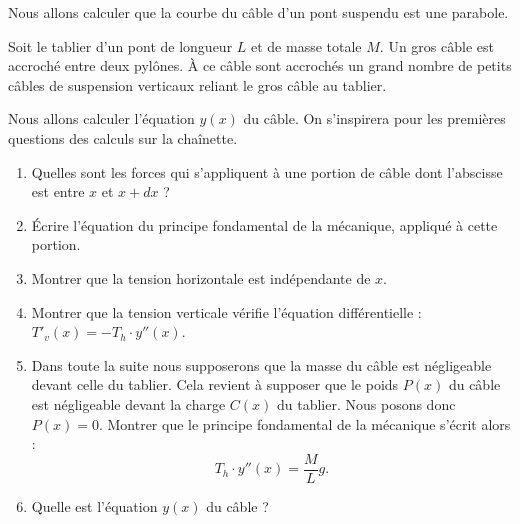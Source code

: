 \documentclass[class=report,crop=false]{standalone}
\begin{document}
\medskip



\begin{exercicecours}
Nous allons calculer que la courbe du câble d'un pont suspendu
est une parabole.


Soit le tablier d'un pont de longueur $L$ et de masse totale $M$.
Un gros câble est accroché entre deux pylônes. \`A ce câble sont accrochés
un grand nombre de petits câbles de suspension verticaux reliant le gros câble au tablier.

\shorthandoff{:}
\shorthandon{:}
Nous allons calculer l'équation $y(x)$ du câble. On s'inspirera pour les premières questions
des calculs sur la chaînette.

\begin{enumerate}

 \item Quelles sont les forces qui s'appliquent à une portion de câble dont l'abscisse est entre
 $x$ et $x+dx$ ?


 \item \'Ecrire l'équation du principe fondamental de la mécanique, appliqué à cette portion.


 \item Montrer que la tension horizontale est indépendante de $x$.


 \item Montrer que la tension verticale vérifie l'équation différentielle :
$T'_v(x)=-T_h \cdot y''(x)$.


 \item Dans toute la suite nous supposerons que la masse du câble est négligeable devant
celle du tablier. Cela revient à supposer que le poids $P(x)$ du câble est négligeable devant
la charge $C(x)$ du tablier. Nous posons donc $P(x)=0$.
Montrer que le principe fondamental de la mécanique s'écrit alors :
$$T_h \cdot y''(x) = \frac{M}{L} g.$$


 \item Quelle est l'équation $y(x)$ du câble ?



\end{enumerate}
\end{exercicecours}
\end{document}
